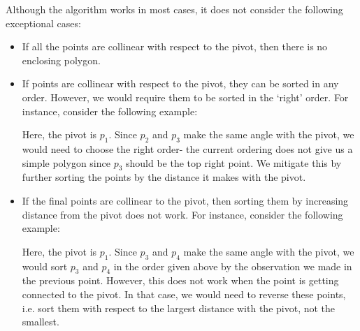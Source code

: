 \documentclass[a4paper, openany]{memoir}
\begin{document}
Although the algorithm works in most cases, it does not consider the following exceptional cases:
\begin{itemize}
    \item If all the points are collinear with respect to the pivot, then there is no enclosing polygon.
    \item If points are collinear with respect to the pivot, they can be sorted in any order. However, we would require them to be sorted in the `right' order. For instance, consider the following example:
    \begin{figure}[H]
        \centering
    \end{figure}
    \noindent Here, the pivot is $p_1$. Since $p_2$ and $p_3$ make the same angle with the pivot, we would need to choose the right order- the current ordering does not give us a simple polygon since $p_3$ should be the top right point. We mitigate this by further sorting the points by the distance it makes with the pivot.
    \item If the final points are collinear to the pivot, then sorting them by increasing distance from the pivot does not work. For instance, consider the following example:
    \begin{figure}[H]
        \centering
    \end{figure}
    \noindent Here, the pivot is $p_1$. Since $p_3$ and $p_4$ make the same angle with the pivot, we would sort $p_3$ and $p_4$ in the order given above by the observation we made in the previous point. However, this does not work when the point is getting connected to the pivot. In that case, we would need to reverse these points, i.e. sort them with respect to the largest distance with the pivot, not the smallest.
\end{itemize}
\end{document}

